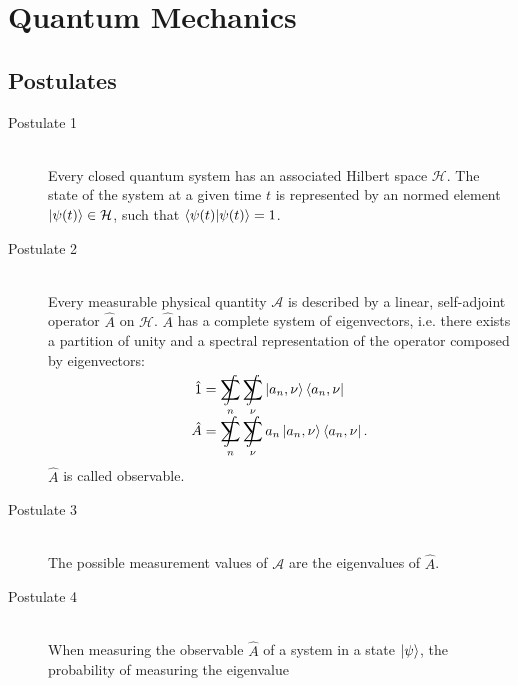 \section{Quantum Mechanics}
	\subsection{Postulates}
		\begin{description} %
			\item[Postulate 1]\hfill \\
				Every closed quantum system has an associated Hilbert space $\mathcal{H}$. The state of the system at a given time $t$ is represented by an normed element $\Ket{\psi(t)} \in \mathcal{H}$, such that $\braket{\psi(t)|\psi(t)} = 1$.
			\item[Postulate 2]\hfill \\
				Every measurable physical quantity $\mathcal{A}$ is described by a linear, self-adjoint operator $\hat{A}$ on $\mathcal{H}$.
				$\hat{A}$ has a complete system of eigenvectors, i.e. there exists a partition of unity and a spectral representation of the operator composed by eigenvectors:
				\begin{equation}
					\begin{aligned}
						\hat{1} &= \SumInt_n \SumInt_\nu \Ket{a_n,\nu}\Bra{a_n,\nu} \\
						\hat{A} &= \SumInt_n \SumInt_\nu a_n\Ket{a_n,\nu}\Bra{a_n,\nu}. \\
					\end{aligned}
				\end{equation}
				$\hat{A}$ is called observable.
			\item[Postulate 3]\hfill \\
				The possible measurement values of $\mathcal{A}$ are the eigenvalues of $\hat{A}$.
			\item[Postulate 4]\hfill \\
				When measuring the observable $\hat{A}$ of a system in a state $\Ket{\psi}$, the probability of measuring the eigenvalue

\end{description}
